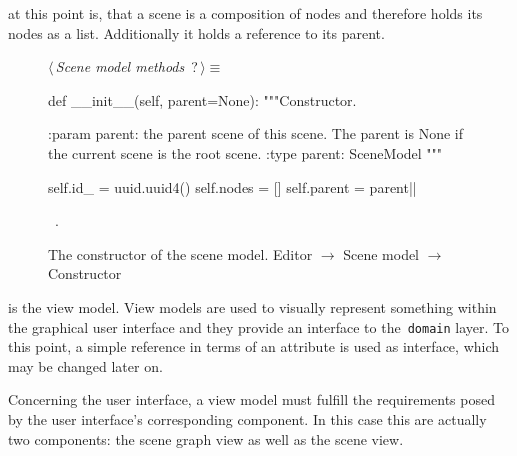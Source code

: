 \documentclass[%
    a4paper,    %
    justified,  %
    nobib,      %
    openany     %
]{tufte-book}
\makeatletter
\renewcommand{\label}[1]{\@tufte@label{##1}}%
\makeatother
\begin{document}
 at this point is, that a scene is a composition
of nodes and therefore holds its nodes as a list. Additionally it holds a
reference to its parent.

\begin{figure}
\begin{flushleft} \small
\begin{minipage}{\linewidth}\label{scrap22}\raggedright\small
{} $\langle\,${\itshape Scene model methods}\nobreak\ {\footnotesize {?}}$\,\rangle\equiv$
\vspace{-1ex}
\begin{pythoncode}
def __init__(self, parent=None):
    """Constructor.

    :param parent: the parent scene of this scene. The parent is
                   None if the current scene is the root scene.
    :type parent:  SceneModel
    """

    self.id_ = uuid.uuid4()
    self.nodes = []
    self.parent = parent|\NWsep|
\end{pythoncode}
\vspace{1.5ex}
\footnotesize
\begin{list}{}{\setlength{\itemsep}{-\parsep}\setlength{\itemindent}{-\leftmargin}}
\item \NWtxtMacroRefIn\ .

\item{}
\end{list}
\end{minipage}\vspace{4ex}
\end{flushleft}
\caption{The constructor of the scene model.
  \newline{}\newline{}Editor $\rightarrow$ Scene model $\rightarrow$ Constructor}
\label{editor:lst:scene-model:constructor}
\end{figure}

 is the view model. View models
are used to visually represent something within the graphical user interface and
they provide an interface to the~\verb=domain= layer. To this point, a simple
reference in terms of an attribute is used as interface, which may be changed
later on.

Concerning the user interface, a view model must fulfill the requirements posed
by the user interface's corresponding component. In this case this are actually
two components: the scene graph view as well as the scene view.
\end{document}
